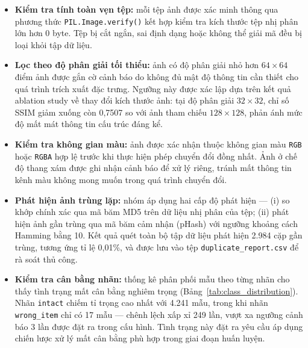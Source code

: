 \begin{itemize}[labelsep=10pt, leftmargin=2cm]
    \item \textbf{Kiểm tra tính toàn vẹn tệp:} mỗi tệp ảnh được xác minh thông qua phương thức \texttt{PIL.Image.verify()} kết hợp kiểm tra kích thước tệp nhị phân lớn hơn 0 byte. Tệp bị cắt ngắn, sai định dạng hoặc không thể giải mã đều bị loại khỏi tập dữ liệu.

    \item \textbf{Lọc theo độ phân giải tối thiểu:} ảnh có độ phân giải nhỏ hơn $64 \times 64$ điểm ảnh được gắn cờ cảnh báo do không đủ mật độ thông tin cần thiết cho quá trình trích xuất đặc trưng. Ngưỡng này được xác lập dựa trên kết quả ablation study về thay đổi kích thước ảnh: tại độ phân giải $32 \times 32$, chỉ số SSIM giảm xuống còn 0,7507 so với ảnh tham chiếu $128 \times 128$, phản ánh mức độ mất mát thông tin cấu trúc đáng kể.

    \item \textbf{Kiểm tra không gian màu:} ảnh được xác nhận thuộc không gian màu \texttt{RGB} hoặc \texttt{RGBA} hợp lệ trước khi thực hiện phép chuyển đổi đồng nhất. Ảnh ở chế độ thang xám được ghi nhận cảnh báo để xử lý riêng, tránh mất thông tin kênh màu không mong muốn trong quá trình chuyển đổi.

    \item \textbf{Phát hiện ảnh trùng lặp:} nhóm áp dụng hai cấp độ phát hiện --- (i) so khớp chính xác qua mã băm MD5 trên dữ liệu nhị phân của tệp; (ii) phát hiện ảnh gần trùng qua mã băm cảm nhận (pHash) với ngưỡng khoảng cách Hamming bằng 10. Kết quả quét toàn bộ tập dữ liệu phát hiện 2.984 cặp gần trùng, tương ứng tỉ lệ 0,01\%, và được lưu vào tệp \texttt{duplicate\_report.csv} để rà soát thủ công.

    \item \textbf{Kiểm tra cân bằng nhãn:} thống kê phân phối mẫu theo từng nhãn cho thấy tình trạng mất cân bằng nghiêm trọng (Bảng~\ref{tab:class_distribution}). Nhãn \texttt{intact} chiếm tỉ trọng cao nhất với 4.241 mẫu, trong khi nhãn \texttt{wrong\_item} chỉ có 17 mẫu --- chênh lệch xấp xỉ 249 lần, vượt xa ngưỡng cảnh báo 3 lần được đặt ra trong cấu hình. Tình trạng này đặt ra yêu cầu áp dụng chiến lược xử lý mất cân bằng phù hợp trong giai đoạn huấn luyện.
\end{itemize}

